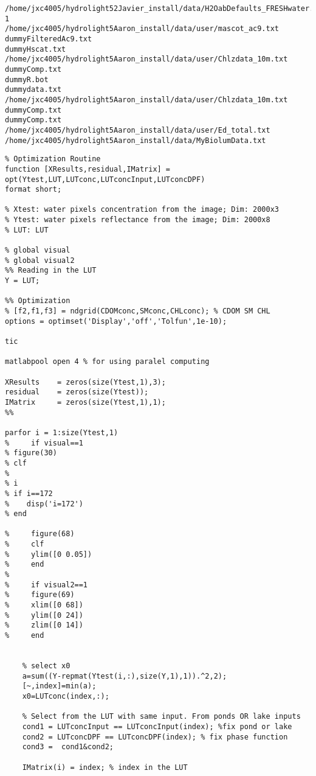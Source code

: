 \begin{appendices}
\begin{lstlisting}
/home/jxc4005/hydrolight52Javier_install/data/H2OabDefaults_FRESHwater.txt
1
/home/jxc4005/hydrolight5Aaron_install/data/user/mascot_ac9.txt
dummyFilteredAc9.txt
dummyHscat.txt
/home/jxc4005/hydrolight5Aaron_install/data/user/Chlzdata_10m.txt
dummyComp.txt
dummyR.bot
dummydata.txt
/home/jxc4005/hydrolight5Aaron_install/data/user/Chlzdata_10m.txt
dummyComp.txt
dummyComp.txt
/home/jxc4005/hydrolight5Aaron_install/data/user/Ed_total.txt
/home/jxc4005/hydrolight5Aaron_install/data/MyBiolumData.txt
\end{lstlisting}
\singlespacing
{}
\renewcommand{\lstlistingname}{Code}
\begin{lstlisting}
% Optimization Routine
function [XResults,residual,IMatrix] = opt(Ytest,LUT,LUTconc,LUTconcInput,LUTconcDPF)
format short;

% Xtest: water pixels concentration from the image; Dim: 2000x3
% Ytest: water pixels reflectance from the image; Dim: 2000x8
% LUT: LUT

% global visual
% global visual2
%% Reading in the LUT
Y = LUT;

%% Optimization
% [f2,f1,f3] = ndgrid(CDOMconc,SMconc,CHLconc); % CDOM SM CHL
options = optimset('Display','off','Tolfun',1e-10);

tic

matlabpool open 4 % for using paralel computing

XResults    = zeros(size(Ytest,1),3);
residual    = zeros(size(Ytest));
IMatrix     = zeros(size(Ytest,1),1);
%%

parfor i = 1:size(Ytest,1)
%     if visual==1
% figure(30)
% clf
% 
% i
% if i==172
%    disp('i=172') 
% end

%     figure(68)
%     clf
%     ylim([0 0.05])
%     end 
%     
%     if visual2==1
%     figure(69)
%     xlim([0 68])
%     ylim([0 24])
%     zlim([0 14])
%     end
    

    % select x0
    a=sum((Y-repmat(Ytest(i,:),size(Y,1),1)).^2,2);
    [~,index]=min(a);
    x0=LUTconc(index,:);

    % Select from the LUT with same input. From ponds OR lake inputs
    cond1 = LUTconcInput == LUTconcInput(index); %fix pond or lake
    cond2 = LUTconcDPF == LUTconcDPF(index); % fix phase function
    cond3 =  cond1&cond2;
    
    IMatrix(i) = index; % index in the LUT
    

\end{lstlisting}
\end{appendices}
